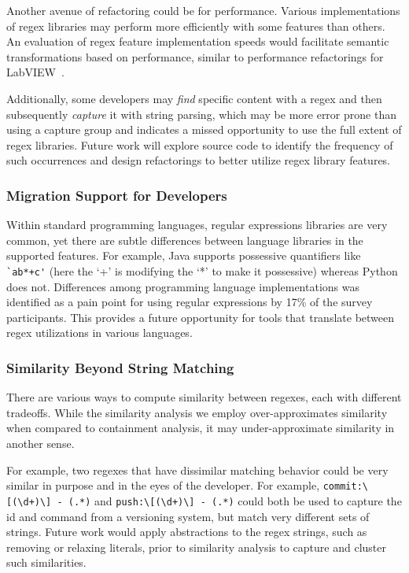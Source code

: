 Another avenue of refactoring could be for performance. Various implementations of regex libraries may perform more efficiently with some features than others. An evaluation of regex feature implementation speeds would facilitate semantic transformations based on performance, similar to performance refactorings for LabVIEW~\cite{chambers2013smell, chambers2015impact}.

Additionally, some developers may  \emph{find} specific content with a regex  and then subsequently \emph{capture} it with string parsing, which may be more error prone than using a capture group and indicates a missed opportunity to use the full extent of regex libraries. Future work will explore source code to identify the frequency of such occurrences and design refactorings to better utilize regex library features.

\vspace{-2pt}
\subsubsection{Migration  Support for Developers}
Within standard programming languages, regular expressions libraries are very common, yet there are subtle  differences between language libraries in the supported features. For example, Java supports possessive quantifiers like \verb! `ab*+c'! (here the `+' is modifying the `*' to make it possessive) whereas Python does not. Differences among programming language implementations was identified as a pain point for using regular expressions by 17\% of the survey participants. This provides a future opportunity for tools that translate between regex utilizations in various languages.

\vspace{-2pt}
\subsubsection{Similarity Beyond String Matching}
There are various ways to compute similarity between regexes, each with different tradeoffs.
While the similarity analysis we employ over-approximates similarity when compared to containment analysis, it may under-approximate similarity in another sense.

For example, two regexes that have dissimilar matching behavior could be very similar in purpose and in the eyes of the developer. For example, \verb!commit:\[(\d+)\] - (.*)! and \verb!push:\[(\d+)\] - (.*)! could both be used to  capture the id and command from a versioning system, but match very different sets of strings. Future work would apply abstractions to the regex strings, such as removing or relaxing literals, prior to similarity analysis to capture and cluster such similarities.

